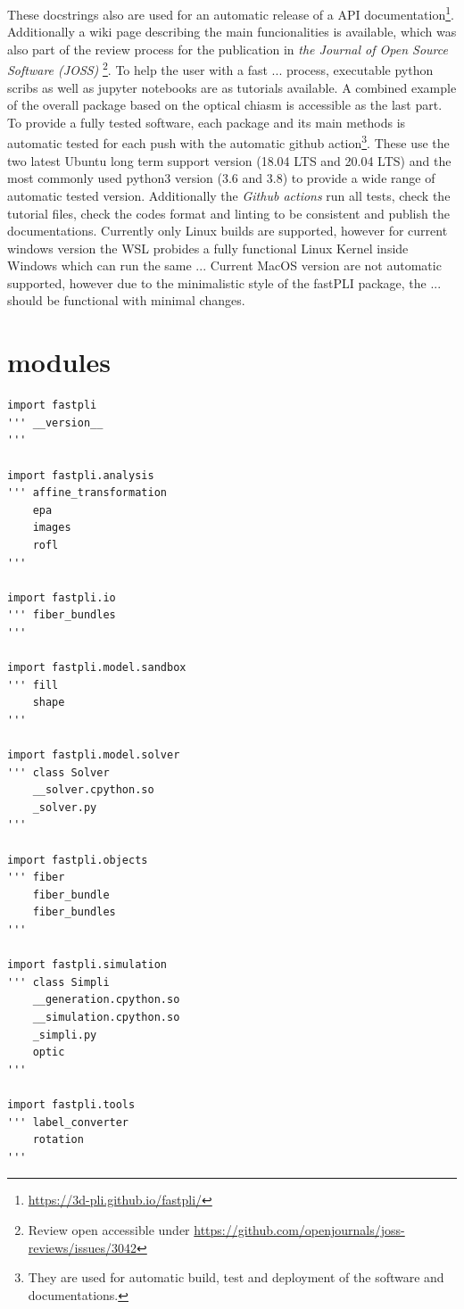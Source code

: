 % 
These docstrings also are used for an automatic release of a \ac{API} documentation\footnote{\url{https://3d-pli.github.io/fastpli/}}.
Additionally a wiki page describing the main funcionalities is available, which was also part of the review process for the publication in \textit{the Journal of Open Source Software (JOSS)} \cite{Matuschke2021} \footnote{Review open accessible under \url{https://github.com/openjournals/joss-reviews/issues/3042}}.
% 
To help the user with a fast ... process, executable python scribs as well as jupyter notebooks are as tutorials available.
A combined example of the overall package based on the optical chiasm is accessible as the last part.
\\
% 
To provide a fully tested software, each package and its main methods is automatic tested for each push with the automatic github action\footnote{They are \eg{} used for automatic build, test and deployment of the software and documentations.}.
These use the two latest Ubuntu long term support version (18.04 LTS and 20.04 LTS) and the most commonly used python3 version (3.6 and 3.8) to provide a wide range of automatic tested version.
Additionally the \textit{Github actions} run all tests, check the tutorial files, check the codes format and linting to be consistent and publish the documentations.
% 
Currently only Linux builds are supported, however for current windows version the \ac{WSL} probides a fully functional Linux Kernel inside Windows which can run the same ...
Current MacOS version are not automatic supported, however due to the minimalistic style of the \ac{fastPLI} package, the ... should be functional with minimal changes.
% 
% 
%  
\section{modules}
% 
\begin{lstfloat}[!ht]
\lstset{style=python}
\begin{lstlisting}
import fastpli
''' __version__
'''

import fastpli.analysis
''' affine_transformation
    epa
    images
    rofl
'''

import fastpli.io
''' fiber_bundles
'''

import fastpli.model.sandbox
''' fill
    shape
'''

import fastpli.model.solver
''' class Solver
    __solver.cpython.so
    _solver.py
'''

import fastpli.objects
''' fiber
    fiber_bundle
    fiber_bundles
'''

import fastpli.simulation
''' class Simpli
    __generation.cpython.so
    __simulation.cpython.so
    _simpli.py
    optic
'''

import fastpli.tools
''' label_converter
    rotation
'''
\end{lstlisting}
\caption[Overview \fastpli{} package]{Overview \fastpli{} package with containing modules}
\end{lstfloat}
% 
% 
%  
